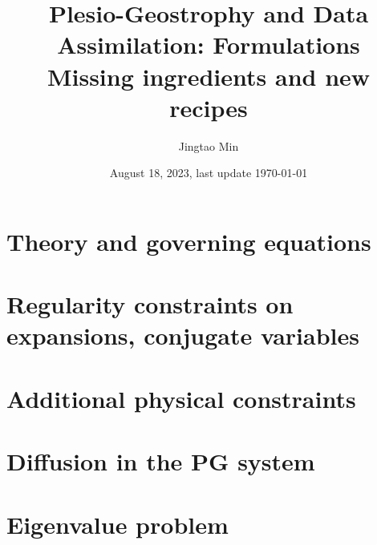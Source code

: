\documentclass[a4paper, 11pt]{report}
\title{Plesio-Geostrophy and Data Assimilation: Formulations \\ {\Large Missing ingredients and new recipes}}
\author{Jingtao Min}
\date{August 18, 2023, last update \today}
\begin{document}
\maketitle

\chapter{Theory and governing equations}






















\chapter{Regularity constraints on expansions, conjugate variables}
\label{chap:regularity}








\chapter{Additional physical constraints}




\chapter{Diffusion in the PG system}




\chapter{Eigenvalue problem}


\end{document}
